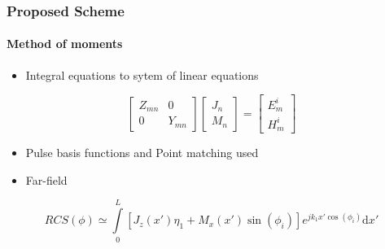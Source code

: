 \documentclass[mathserif,18pt,xcolor=table]{beamer}
\begin{document}
    \begin{frame}
      \frametitle{Proposed Scheme}
      \framesubtitle{Method of moments}
      \begin{itemize}
        \item {Integral equations to sytem of linear equations}
      \end{itemize}
      \[
      \begin{bmatrix}
        Z_{mn}   & 0 \\
        0        & Y_{mn}
      \end{bmatrix}
      \begin{bmatrix}
        J_n \\
        M_n
      \end{bmatrix}
      =
      \begin{bmatrix}
        E_m^i \\
        H_m^i
      \end{bmatrix}
      \]
      \begin{itemize}
        \item {Pulse basis functions and Point matching used}
        \item {Far-field}
      \end{itemize}
      \begin{equation} \nonumber
      RCS({\phi}) \simeq \int \limits_{0}^{L} \left[J_z(x')\eta_1 + M_x(x')\sin(\phi_i)\right] e^{j k_1 x' \cos(\phi_i)} \mathrm{d}x'
      \label{eq:far-field}
    \end{equation}
    \end{frame}
\end{document}
